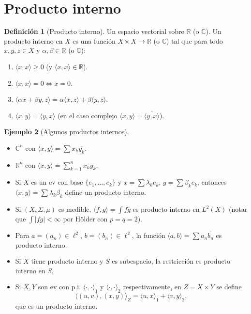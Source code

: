\documentclass[11pt]{article}
\theoremstyle{definition}
\newtheorem{definition}{Definición}[section]
\newtheorem{example}[definition]{Ejemplo}
\theoremstyle{plain}
\begin{document}

\section*{Producto interno}

\begin{definition}[Producto interno]
Un espacio vectorial sobre $\mathbb{R}$ (o $\mathbb{C}$). Un producto interno en $X$ es una función $X\times X\to\mathbb{R}$ (o $\mathbb{C}$) tal que para todo $x,y,z\in X$ y $\alpha,\beta\in\mathbb{R}$ (o $\mathbb{C}$):
\begin{enumerate}[label=\alph*)]
\item $\langle x,x\rangle\ge 0$ (y $\langle x,x\rangle\in\mathbb{R}$).
\item $\langle x,x\rangle=0\iff x=0$.
\item $\langle\alpha x+\beta y,z\rangle=\alpha\langle x,z\rangle+\beta\langle y,z\rangle$.
\item $\langle x,y\rangle=\langle y,x\rangle$ (en el caso complejo $\langle x,y\rangle=\overline{\langle y,x\rangle}$).
\end{enumerate}
\end{definition}

\begin{example}[Algunos productos internos]
\begin{itemize}
\item $\mathbb{C}^n$ con $\langle x,y\rangle=\sum x_k\overline{y_k}$.
\item $\mathbb{R}^n$ con $\langle x,y\rangle=\sum_{k=1}^n x_k y_k$.
\item Si $X$ es un ev con base $\{e_1,\dots,e_k\}$ y $x=\sum\lambda_k e_k$, $y=\sum\beta_k e_k$, entonces
$\langle x,y\rangle=\sum \lambda_k\overline{\beta_k}$ define un producto interno.
\item Si $(X,\Sigma,\mu)$ es medible, $\langle f,g\rangle=\int f\overline{g}$ es producto interno en $L^2(X)$ (notar que $\int|fg|<\infty$ por Hölder con $p=q=2$).
\item Para $a=(a_n)\in\ell^2$, $b=(b_n)\in\ell^2$, la función $\langle a,b\rangle=\sum a_n\overline{b_n}$ es producto interno.
\item Si $X$ tiene producto interno y $S$ es subespacio, la restricción es producto interno en $S$.
\item Si $X,Y$ son ev con p.i. $\langle\cdot,\cdot\rangle_1$ y $\langle\cdot,\cdot\rangle_2$ respectivamente, en $Z=X\times Y$ se define
\[\langle (u,v),(x,y)\rangle_Z=\langle u,x\rangle_1+\langle v,y\rangle_2,\]
que es un producto interno.
\end{itemize}
\end{example}
\end{document}
